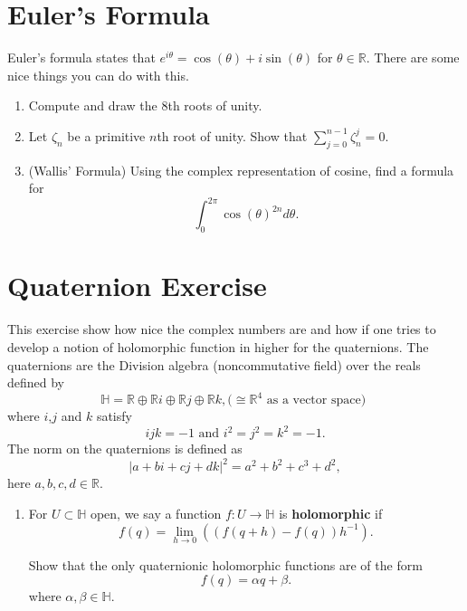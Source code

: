 \documentclass[a4paper,10pt]{article}
\title{}
\author{Dupuy --- Complex Analysis Problem Bank}
\date{}
\newcommand{\RR}{\mathbb{R}}
\newcommand{\HH}{\mathbb{H}}
\begin{document}
\maketitle
\tableofcontents

\newpage

\section{Euler's Formula}
Euler's formula states that $e^{i\theta} =\cos(\theta) +i\sin(\theta)$ for $\theta \in \RR$. 
There are some nice things you can do with this. 

\begin{enumerate}
\item Compute and draw the 8th roots of unity.
\item Let $\zeta_n$ be a primitive $n$th root of unity. Show that $\sum_{j=0}^{n-1} \zeta_n^j=0$.

\item (Wallis' Formula) Using the complex representation of cosine, find a formula for 
 $$ \int_0^{2\pi} \cos(\theta)^{2n} d\theta. $$
 
\end{enumerate}

\newpage

\section{Quaternion Exercise}

This exercise show how nice the complex numbers are and how if one tries to develop a notion of holomorphic function in higher for the quaternions.
The quaternions are the Division algebra (noncommutative field) over the reals defined by 
$$\HH= \RR \oplus \RR i \oplus \RR j \oplus \RR k, \mbox{($\cong \RR^4$ as a vector space) } $$ 
where $i$,$j$ and $k$ satisfy
$$ ijk = -1 \mbox{ and } i^2 = j^2 = k^2 = -1.$$
The norm on the quaternions is defined as 
$$ \vert a+bi+cj+dk \vert^2 = a^2 + b^2 + c^3 + d^2,$$
here $a,b,c,d \in\RR$.

\begin{enumerate}
\item 
For $U\subset \HH$ open, we say a function $f: U \to \HH$ is \textbf{holomorphic} if 
$$ f(q) = \lim_{h\to 0} \left( (f(q+h)-f(q))h^{-1}  \right). $$


Show that the only quaternionic holomorphic functions are of the form 
$$f(q) = \alpha q + \beta.$$
where $\alpha,\beta \in \HH$.
\end{enumerate}
\end{document}
